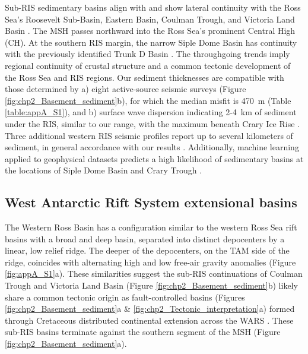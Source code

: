 Sub-RIS sedimentary basins align with and show lateral continuity with the Ross Sea’s Roosevelt Sub-Basin, Eastern Basin, Coulman Trough, and Victoria Land Basin \citep[Figure \ref{fig:chp2_Basement_sediment}, e.g.][]{coopergeology1995}. The MSH passes northward into the Ross Sea's prominent Central High (CH). At the southern RIS margin, the narrow Siple Dome Basin has continuity with the previously identified Trunk D Basin \citep[Figure \ref{fig:chp2_Basement_sediment}a,][]{bellidentifying2006}. The throughgoing trends imply regional continuity of crustal structure and a common tectonic development of the Ross Sea and RIS regions. Our sediment thicknesses are compatible with those determined by a) eight active-source seismic surveys (Figure \ref{fig:chp2_Basement_sediment}b), for which the median misfit is 470~m (Table \ref{table:appA_S1}), and b) surface wave dispersion indicating 2-4~km of sediment under the RIS, similar to our range, with the maximum beneath Crary Ice Rise \citep{zhouradial2022}. Three additional western RIS seismic profiles report up to several kilometers of sediment, in general accordance with our results \citep{sternlithospheric1991, tenbrinkgeophysical1993, beaudoincharacteristics1992}. Additionally, machine learning applied to geophysical datasets predicts a high likelihood of sedimentary basins at the locations of Siple Dome Basin and Crary Trough \citep{lisedimentary2022}.

\subsection{West Antarctic Rift System extensional basins}
The Western Ross Basin has a configuration similar to the western Ross Sea rift basins \citep[e.g.][]{salvinicenozoic1997} with a broad and deep basin, separated into distinct depocenters by a linear, low relief ridge. The deeper of the depocenters, on the TAM side of the ridge, coincides with alternating high and low free-air gravity anomalies (Figure \ref{fig:appA_S1}a). These similarities suggest the sub-RIS continuations of  Coulman Trough and Victoria Land Basin (Figure \ref{fig:chp2_Basement_sediment}b) likely share a common tectonic origin as fault-controlled basins (Figures \ref{fig:chp2_Basement_sediment}a \& \ref{fig:chp2_Tectonic_interpretation}a) formed through Cretaceous distributed continental extension across the WARS \citep{jordangeological2020}. These sub-RIS basins terminate against the southern segment of the MSH (Figure \ref{fig:chp2_Basement_sediment}a).\\

